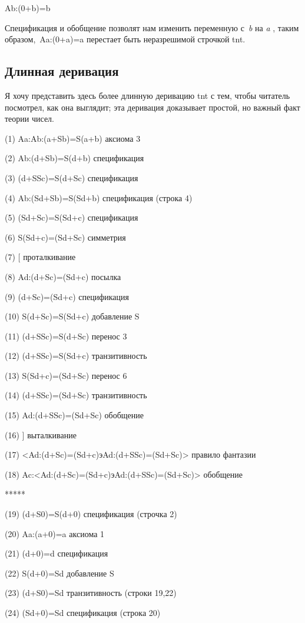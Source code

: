 \documentclass[../main.tex]{subfiles}
\begin{document}
Ab:(0+b)=b

Спецификация и обобщение позволят нам изменить переменную с~\emph{b} на \emph{a} , таким образом,~Aa:(0+a)=a перестает быть неразрешимой строчкой \acs{tnt}.


\subsection{Длинная деривация}

Я хочу представить здесь более длинную деривацию \acs{tnt} с тем, чтобы читатель посмотрел, как она выглядит; эта деривация доказывает простой, но важный факт теории чисел.

(1) Aa:Ab:(a+Sb)=S(a+b) аксиома 3

(2) Ab:(d+Sb)=S(d+b) спецификация

(3) (d+SSc)=S(d+Sc) спецификация

(4) Ab:(Sd+Sb)=S(Sd+b) спецификация (строка 4)

(5) (Sd+Sc)=S(Sd+c) спецификация

(6) S(Sd+c)=(Sd+Sc) симметрия

(7) {[} проталкивание

(8) Ad:(d+Sc)=(Sd+c) посылка

(9) (d+Sc)=(Sd+c) спецификация

(10) S(d+Sc)=S(Sd+c) добавление S

(11) (d+SSc)=S(d+Sc) перенос 3

(12) (d+SSc)=S(Sd+c) транзитивность

(13) S(Sd+c)=(Sd+Sc) перенос 6

(14) (d+SSc)=(Sd+Sc) транзитивность

(15) Ad:(d+SSc)=(Sd+Sc) обобщение

(16) {]} выталкивание

(17) \textless Ad:(d+Sc)=(Sd+c)эAd:(d+SSc)=(Sd+Sc)\textgreater{} правило фантазии

(18) Ac:\textless Ad:(d+Sc)=(Sd+c)эAd:(d+SSc)=(Sd+Sc)\textgreater{} обобщение

*****

(19) (d+S0)=S(d+0) спецификация (строчка 2)

(20) Aa:(a+0)=a аксиома 1

(21) (d+0)=d спецификация

(22) S(d+0)=Sd добавление S

(23) (d+S0)=Sd транзитивность (строки 19,22)

(24) (Sd+0)=Sd спецификация (строка 20)
\end{document}

